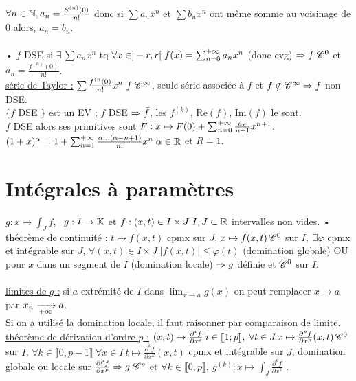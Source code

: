 \documentclass[12 pt]{exampleclass}
\begin{document}
$\forall n\in\mathbb{N}, a_n = \frac{S^{(n)}(0)}{n!}$ donc si $\sum a_n x^n$ et $\sum b_n x^n$ ont même somme au voisinage de 0 alors, $a_n=b_n$.\\
\text{}\\
• $f$ DSE si $\exists \, \sum a_n x^n$ tq $\forall x\in ]-r,r[ \; f(x) = \sum_{n=0}^{+\infty} a_n x^n$ (donc cvg) $\Rightarrow f \; \mathscr{C}^0$ et $a_n = \frac{f^{(n)}(0)}{n!}$.\\
\underline{série de Taylor :} $\sum \frac{f^{(n}(0)}{n!}x^n \ f \; \mathscr{C}^\infty$, seule série associée à $f$ et $f\notin\mathscr{C}^\infty \Rightarrow f$ non DSE.\\
$\{ f$ DSE $\}$ est un EV ; $f$ DSE $\Rightarrow \bar{f}$, les $f^{(k)}$, Re$(f)$, Im$(f)$ le sont.\\
$f$ DSE alors ses primitives sont $F:x\mapsto F(0) + \sum_{n=0}^{+\infty} \frac{a_n}{n+1} x^{n+1}$.\\
$(1+x)^\alpha = 1 + \sum_{n=1}^{+\infty} \frac{\alpha \dots (\alpha-n+1)}{n!} x^n \; \alpha\in\mathbb{R}$ et $R=1$.\\

\section{Intégrales à paramètres}

$g : x\mapsto \int_J f$, \ $g:I\to \mathbb{K}$ et $f:(x,t)\in I\times J \ I,J\subset \mathbb{R}$ intervalles non vides.\/
• \underline{théorème de continuité :} $t\mapsto f(x,t)$ cpmx sur $J, \, x\mapsto f(x,t) \, \mathscr{C}^0$ sur $I, \; \exists \varphi$ cpmx et intégrable sur $J$, $\forall (x,t)\in I\times J \; |f(x,t)|\leqslant \varphi(t)$ (domination globale) OU pour $x$ dans un segment de $I$ (domination locale) $\Rightarrow g$ définie et $\mathscr{C}^0$ sur $I$.\\
\text{}\\
\underline{limites de $g$ :} si $a$ extrémité de $I$ dans $\lim_{x\to a} g(x)$ on peut remplacer $x\to a$ par $x_n\xrightarrow[+\infty]{} a$.\\
Si on a utilisé la domination locale, il faut raisonner par comparaison de limite.\\
\underline{théorème de dérivation d'ordre $p$ :} $(x,t) \mapsto \frac{\partial^i f}{\partial x^i} \; i\in\llbracket 1;p\rrbracket, \; \forall t\in J \, x\mapsto \frac{\partial^p f}{\partial x^p}(x,t) \, \mathscr{C}^0$ sur $I$, $\forall k\in\llbracket 0,p-1\rrbracket \ \forall x\in I \ t\mapsto \frac{\partial^k f}{\partial x^k}(x,t)$ cpmx et intégrable sur $J$, domination globale ou locale sur $\frac{\partial^p f}{\partial x^p} \Ra g \ \sC^p$ et $\forall k\in \llbracket 0,p\rrbracket, \ g^{(k)} : x\mapsto \int_J \frac{\partial^k f}{\partial x^k}$ .\\
\end{document}
